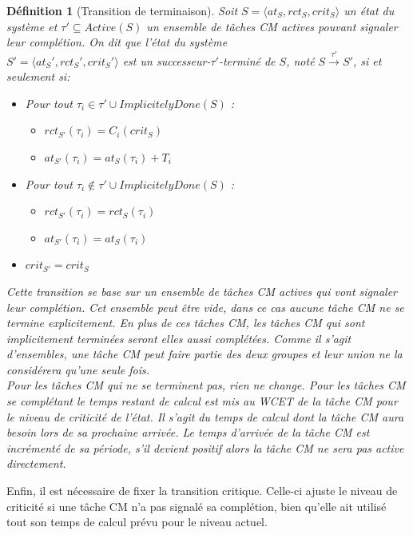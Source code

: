 \documentclass[12pt,a4paper,oneside]{book}
\theoremstyle{break}
\newtheorem{defin}{Définition}[chapter]
\theoremstyle{breakplain}
\begin{document}
\begin{defin}[Transition de terminaison]
Soit $S = \langle at_S, rct_S, crit_S \rangle$ un état du système et $\tau' \subseteq Active(S)$ un ensemble de tâches CM actives pouvant signaler leur complétion. On dit que l'état du système \\$S' = \langle at_S', rct_S', crit_S' \rangle$ est un \textit{successeur-$\tau'$-terminé} de $S$, noté $S\xrightarrow{\tau'}S'$, si et seulement si:
\begin{itemize}

\item Pour tout $\tau_i \in \tau' \cup ImplicitelyDone(S)$ :\begin{itemize}
\item $rct_{S'}(\tau_i) = C_i(crit_S)$
\item $at_{S'}(\tau_i) = at_{S}(\tau_i)+T_i$
\end{itemize}
\item Pour tout $\tau_i \notin \tau' \cup ImplicitelyDone(S)$ :\begin{itemize}
\item $rct_{S'}(\tau_i) = rct_{S}(\tau_i)$
\item $at_{S'}(\tau_i) = at_{S}(\tau_i)$
\end{itemize}
\item $crit_{S'} = crit_{S}$
\end{itemize}

Cette transition se base sur un ensemble de tâches CM actives qui vont signaler leur complétion. Cet ensemble peut être vide, dans ce cas aucune tâche CM ne se termine explicitement. En plus de ces tâches CM, les tâches CM qui sont implicitement terminées seront elles aussi complétées. Comme il s'agit d'ensembles, une tâche CM peut faire partie des deux groupes et leur union ne la considérera qu'une seule fois.\\

Pour les tâches CM qui ne se terminent pas, rien ne change. Pour les tâches CM se complétant le temps restant de calcul est mis au WCET de la tâche CM pour le niveau de criticité de l'état. Il s'agit du temps de calcul dont la tâche CM aura besoin lors de sa prochaine arrivée. Le temps d'arrivée de la tâche CM est incrémenté de sa période, s'il devient positif alors la tâche CM ne sera pas active directement.

\end{defin}

Enfin, il est nécessaire de fixer la transition critique. Celle-ci ajuste le niveau de criticité si une tâche CM n'a pas signalé sa complétion, bien qu'elle ait utilisé tout son temps de calcul prévu pour le niveau actuel.\\
\end{document}
